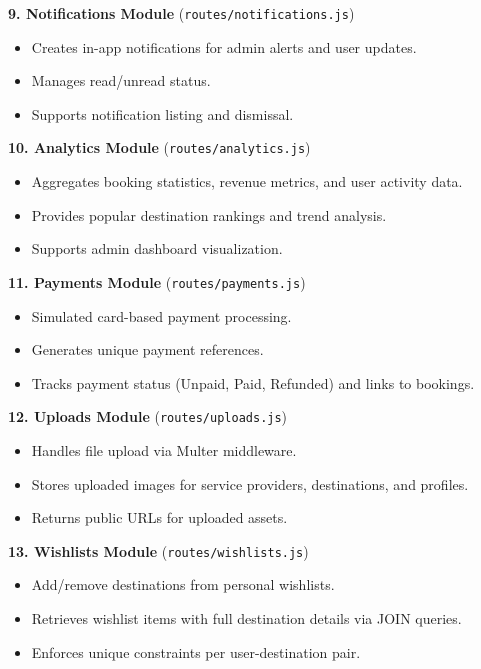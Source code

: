 \textbf{9. Notifications Module} (\texttt{routes/notifications.js})
\begin{itemize}[leftmargin=2em]
    \item Creates in-app notifications for admin alerts and user updates.
    \item Manages read/unread status.
    \item Supports notification listing and dismissal.
\end{itemize}

\textbf{10. Analytics Module} (\texttt{routes/analytics.js})
\begin{itemize}[leftmargin=2em]
    \item Aggregates booking statistics, revenue metrics, and user activity data.
    \item Provides popular destination rankings and trend analysis.
    \item Supports admin dashboard visualization.
\end{itemize}

\textbf{11. Payments Module} (\texttt{routes/payments.js})
\begin{itemize}[leftmargin=2em]
    \item Simulated card-based payment processing.
    \item Generates unique payment references.
    \item Tracks payment status (Unpaid, Paid, Refunded) and links to bookings.
\end{itemize}

\textbf{12. Uploads Module} (\texttt{routes/uploads.js})
\begin{itemize}[leftmargin=2em]
    \item Handles file upload via Multer middleware.
    \item Stores uploaded images for service providers, destinations, and profiles.
    \item Returns public URLs for uploaded assets.
\end{itemize}

\textbf{13. Wishlists Module} (\texttt{routes/wishlists.js})
\begin{itemize}[leftmargin=2em]
    \item Add/remove destinations from personal wishlists.
    \item Retrieves wishlist items with full destination details via JOIN queries.
    \item Enforces unique constraints per user-destination pair.
\end{itemize}

